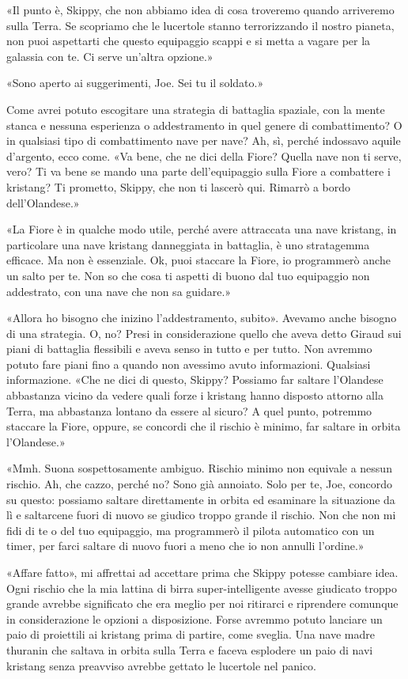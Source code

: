 «Il punto è, Skippy, che non abbiamo idea di cosa troveremo quando
arriveremo sulla Terra. Se scopriamo che le lucertole stanno
terrorizzando il nostro pianeta, non puoi aspettarti che questo
equipaggio scappi e si metta a vagare per la galassia con te. Ci serve
un'altra opzione.»

«Sono aperto ai suggerimenti, Joe. Sei tu il soldato.»

Come avrei potuto escogitare una strategia di battaglia spaziale, con la
mente stanca e nessuna esperienza o addestramento in quel genere di
combattimento? O in qualsiasi tipo di combattimento nave per nave? Ah,
sì, perché indossavo aquile d'argento, ecco come. «Va bene, che ne dici
della Fiore? Quella nave non ti serve, vero? Ti va bene se mando una
parte dell'equipaggio sulla Fiore a combattere i kristang? Ti prometto,
Skippy, che non ti lascerò qui. Rimarrò a bordo dell'Olandese.»

«La Fiore è in qualche modo utile, perché avere attraccata una nave
kristang, in particolare una nave kristang danneggiata in battaglia, è
uno stratagemma efficace. Ma non è essenziale. Ok, puoi staccare la
Fiore, io programmerò anche un salto per te. Non so che cosa ti aspetti
di buono dal tuo equipaggio non addestrato, con una nave che non sa
guidare.»

«Allora ho bisogno che inizino l'addestramento, subito». Avevamo anche
bisogno di una strategia. O, no? Presi in considerazione quello che
aveva detto Giraud sui piani di battaglia flessibili e aveva senso in
tutto e per tutto. Non avremmo potuto fare piani fino a quando non
avessimo avuto informazioni. Qualsiasi informazione. «Che ne dici di
questo, Skippy? Possiamo far saltare l'Olandese abbastanza vicino da
vedere quali forze i kristang hanno disposto attorno alla Terra, ma
abbastanza lontano da essere al sicuro? A quel punto, potremmo staccare
la Fiore, oppure, se concordi che il rischio è minimo, far saltare in
orbita l'Olandese.»

«Mmh. Suona sospettosamente ambiguo. Rischio minimo non equivale a
nessun rischio. Ah, che cazzo, perché no? Sono già annoiato. Solo per
te, Joe, concordo su questo: possiamo saltare direttamente in orbita ed
esaminare la situazione da lì e saltarcene fuori di nuovo se giudico
troppo grande il rischio. Non che non mi fidi di te o del tuo
equipaggio, ma programmerò il pilota automatico con un timer, per farci
saltare di nuovo fuori a meno che io non annulli l'ordine.»

«Affare fatto», mi affrettai ad accettare prima che Skippy potesse
cambiare idea. Ogni rischio che la mia lattina di birra
super-intelligente avesse giudicato troppo grande avrebbe significato
che era meglio per noi ritirarci e riprendere comunque in considerazione
le opzioni a disposizione. Forse avremmo potuto lanciare un paio di
proiettili ai kristang prima di partire, come sveglia. Una nave madre
thuranin che saltava in orbita sulla Terra e faceva esplodere un paio di
navi kristang senza preavviso avrebbe gettato le lucertole nel panico.

